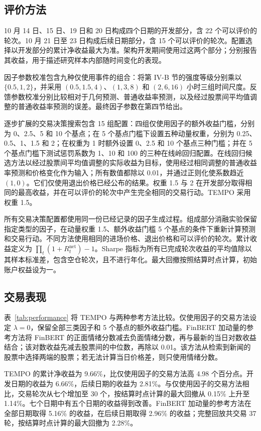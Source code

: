 \documentclass[conference]{IEEEtran}
\begin{document}
\subsection{评价方法}
10 月 14 日、15 日、19 日和 20 日构成四个日期的开发部分，含 22 个可以评价的轮次。10 月 21 日至 23 日构成后续日期部分，含 15 个可以评价的轮次。配置选择以开发部分的累计净收益最大为准。架构开发期间使用过这两个部分；分别报告其收益，用于描述研究样本内部随时间变化的表现。

因子参数校准包含九种仅使用事件的组合：将第 IV-B 节的强度等级分别乘以 $\{0.5,1,2\}$，并采用 $(0.5,1.5,4)$、$(1,3,8)$ 和 $(2,6,16)$ 小时三组时间尺度。反馈参数校准分别比较相对于几何预测、普通收益率预测，以及经过股票间平均值调整的普通收益率预测的误差。最终因子参数在第四节给出。

逐步扩展的交易决策搜索包含 15 组配置：四组仅使用因子的额外收益门槛，分别为 0、2.5、5 和 10 个基点；在 5 个基点门槛下设置五种动量权重，分别为 0.25、0.5、1、1.5 和 2；在权重为 1 时额外设置 0、2.5 和 10 个基点三种门槛；并在 5 个基点门槛下测试惩罚系数为 1、10 和 100 的三种在线岭回归配置。在线回归候选方法以经过股票间平均值调整的实际收益为目标，使用经过相同调整的普通收益率预测和价格变化作为输入；所有数值都除以 0.01，并通过正则化使系数趋近 $(1,0)$。它们仅使用退出价格已经公布的结果。权重 1.5 与 2 在开发部分取得相同的最高收益，并在可以评价的轮次中产生完全相同的交易行动。TEMPO 采用权重 1.5。

所有交易决策配置都使用同一份已经记录的因子生成过程。组成部分消融实验保留指定类型的因子，在动量权重 1.5、额外收益门槛 5 个基点的条件下重新计算预测和交易行动。不同方法使用相同的进场价格、退出价格和可以评价的轮次。累计收益定义为 $\prod_t(1+R_t^{\mathrm{net}})-1$。Sharpe 指标为所有已完成轮次收益的平均值除以其样本标准差，包含空仓轮次，且不进行年化。最大回撤按照结算时点计算，初始账户权益设为一。

\subsection{交易表现}
表~\ref{tab:performance} 将 TEMPO 与两种参考方法比较。仅使用因子的交易方法设定 $\lambda=0$，保留全部三类因子和 5 个基点的额外收益门槛。FinBERT 加动量的参考方法将 FinBERT 的正面情绪分数减去负面情绪分数\cite{araci2019}，再与最新的当日对数收益结合；该对数收益先减去股票间的中位数，再除以 0.01。该方法从检索到新闻的股票中选择两端的股票；若无法计算当日价格差，则只使用情绪分数。

TEMPO 的累计净收益为 9.66\%，比仅使用因子的交易方法高 4.98 个百分点。开发日期的收益为 6.66\%，后续日期的收益为 2.81\%。与仅使用因子的交易方法相比，交易轮次从七个增加至 30 个，按结算时点计算的最大回撤从 0.15\% 上升至 1.14\%。七个日期中有五个日期的收益得到改善。FinBERT 加动量的参考方法在全部日期取得 5.16\% 的收益，在后续日期取得 2.96\% 的收益；完整回放共交易 37 轮，按结算时点计算的最大回撤为 2.28\%。
\end{document}
